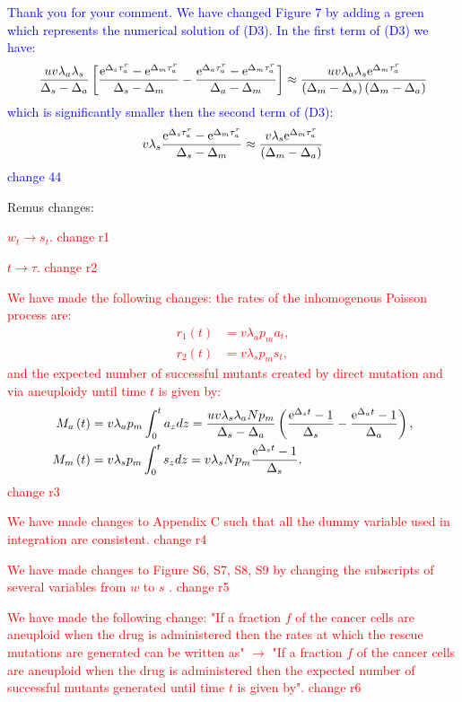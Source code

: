 \documentclass[11pt,a4paper]{article}
\newcommand{\e}{{\rm e}}
\begin{document}
\textcolor{blue}{Thank you for your comment. We have changed Figure 7 by adding a green which represents the numerical solution of (D3).  In the first term of (D3) we have:
\begin{align*}
\frac{uv\lambda_a\lambda_s}{\Delta_s-\Delta_a}\left[\frac{\e^{\Delta_s\tau_a^r}-\e^{\Delta_m\tau_a^r}}{\Delta_s-\Delta_m}-\frac{\e^{\Delta_a\tau_a^r}-\e^{\Delta_m\tau_a^r}}{\Delta_a-\Delta_m}\right]\approx\frac{uv\lambda_a\lambda_s\e^{\Delta_m\tau_a^r}}{\left(\Delta_m-\Delta_s\right)\left(\Delta_m-\Delta_a\right)}
\end{align*}
which is significantly smaller then the second term of (D3):
\begin{align*}
v\lambda_s\frac{\e^{\Delta_s\tau_a^r}-\e^{\Delta_m\tau_a^r}}{\Delta_s-\Delta_m}\approx\frac{v\lambda_s\e^{\Delta_m\tau_a^r}}{\left(\Delta_m-\Delta_a\right)}
\end{align*}
change 44} 

Remus changes:

\textcolor{red}{$w_t\rightarrow s_t$. change r1} 

\textcolor{red}{$t\rightarrow \tau$. change r2} 

\textcolor{red}{
We have made the following changes: the rates of the inhomogenous Poisson process are:
\begin{align*}
r_1\left(t\right)&=v\lambda_ap_ma_{t},\\ 
r_2\left(t\right)&=v\lambda_sp_ms_{t},
\end{align*}
and the expected number of successful mutants created by direct mutation and via aneuploidy until time $t$ is given by:
\begin{align*}
M_a\left(t\right)&=v\lambda_ap_m\int_0^ta_{z} d z = \frac{uv\lambda_s\lambda_aNp_m}{\Delta_s-\Delta_a}\left(\frac{\e^{\Delta_st}-1}{\Delta_s}-\frac{\e^{\Delta_at}-1}{\Delta_a}\right),\\ 
M_m\left(t\right)&=v\lambda_sp_m\int_0^ts_{z} d z = v\lambda_sNp_m\frac{\e^{\Delta_s t}-1}{\Delta_s}.
\end{align*}
change r3} 

\textcolor{red}{We have made changes to Appendix C such that all the dummy variable used in integration are consistent. change r4} 

\textcolor{red}{We have made changes to Figure S6, S7, S8, S9 by changing the subscripts of several variables from $w$ to $s$ . change r5} 

\textcolor{red}{ We have made the following change: "If a fraction $f$ of the cancer cells are aneuploid when the drug is administered then the rates at which the rescue mutations are generated can be written as" $\rightarrow$
"If a fraction $f$ of the cancer cells are aneuploid when the drug is administered then the expected number of successful mutants generated until time $t$ is given by". change r6} 




\end{document}
